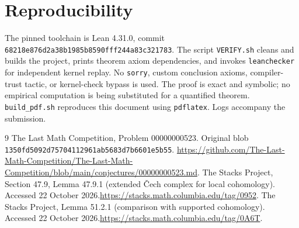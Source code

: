 \documentclass[11pt]{article}
\begin{document}
\section{Reproducibility}
The pinned toolchain is Lean 4.31.0, commit \texttt{68218e876d2a38b1985b8590fff244a83c321783}. The script \texttt{VERIFY.sh} cleans and builds the project, prints theorem axiom dependencies, and invokes \texttt{leanchecker} for independent kernel replay. No \texttt{sorry}, custom conclusion axioms, compiler-trust tactic, or kernel-check bypass is used. The proof is exact and symbolic; no empirical computation is being substituted for a quantified theorem. \texttt{build\_pdf.sh} reproduces this document using \texttt{pdflatex}. Logs accompany the submission.

\begin{thebibliography}{9}
 The Last Math Competition, Problem 00000000523. Original blob \texttt{1350fd5092d75704112961ab5683d7b6601e5b55}.\newline
\url{https://github.com/The-Last-Math-Competition/The-Last-Math-Competition/blob/main/conjectures/00000000523.md}.
 The Stacks Project, Section 47.9, Lemma 47.9.1 (extended \v Cech complex for local cohomology). Accessed 22 October 2026.\newline\url{https://stacks.math.columbia.edu/tag/0952}.
 The Stacks Project, Lemma 51.2.1 (comparison with supported cohomology). Accessed 22 October 2026.\newline\url{https://stacks.math.columbia.edu/tag/0A6T}.
\end{thebibliography}
\end{document}
